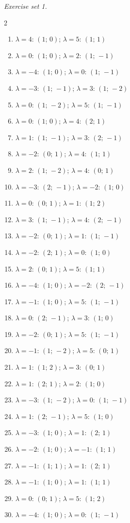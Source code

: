 \par\noindent\emph{Exercise set 1.}\nopagebreak
\begin{multicols}{2}\raggedright
\begin{enumerate}[label=\arabic*., leftmargin=*, itemsep=1pt]
\item $\lambda=4$: $(1;\,0)$; $\lambda=5$: $(1;\,1)$
\item $\lambda=0$: $(1;\,0)$; $\lambda=2$: $(1;\,-1)$
\item $\lambda=-4$: $(1;\,0)$; $\lambda=0$: $(1;\,-1)$
\item $\lambda=-3$: $(1;\,-1)$; $\lambda=3$: $(1;\,-2)$
\item $\lambda=0$: $(1;\,-2)$; $\lambda=5$: $(1;\,-1)$
\item $\lambda=0$: $(1;\,0)$; $\lambda=4$: $(2;\,1)$
\item $\lambda=1$: $(1;\,-1)$; $\lambda=3$: $(2;\,-1)$
\item $\lambda=-2$: $(0;\,1)$; $\lambda=4$: $(1;\,1)$
\item $\lambda=2$: $(1;\,-2)$; $\lambda=4$: $(0;\,1)$
\item $\lambda=-3$: $(2;\,-1)$; $\lambda=-2$: $(1;\,0)$
\item $\lambda=0$: $(0;\,1)$; $\lambda=1$: $(1;\,2)$
\item $\lambda=3$: $(1;\,-1)$; $\lambda=4$: $(2;\,-1)$
\item $\lambda=-2$: $(0;\,1)$; $\lambda=1$: $(1;\,-1)$
\item $\lambda=-2$: $(2;\,1)$; $\lambda=0$: $(1;\,0)$
\item $\lambda=2$: $(0;\,1)$; $\lambda=5$: $(1;\,1)$
\item $\lambda=-4$: $(1;\,0)$; $\lambda=-2$: $(2;\,-1)$
\item $\lambda=-1$: $(1;\,0)$; $\lambda=5$: $(1;\,-1)$
\item $\lambda=0$: $(2;\,-1)$; $\lambda=3$: $(1;\,0)$
\item $\lambda=-2$: $(0;\,1)$; $\lambda=5$: $(1;\,-1)$
\item $\lambda=-1$: $(1;\,-2)$; $\lambda=5$: $(0;\,1)$
\item $\lambda=1$: $(1;\,2)$; $\lambda=3$: $(0;\,1)$
\item $\lambda=1$: $(2;\,1)$; $\lambda=2$: $(1;\,0)$
\item $\lambda=-3$: $(1;\,-2)$; $\lambda=0$: $(1;\,-1)$
\item $\lambda=1$: $(2;\,-1)$; $\lambda=5$: $(1;\,0)$
\item $\lambda=-3$: $(1;\,0)$; $\lambda=1$: $(2;\,1)$
\item $\lambda=-2$: $(1;\,0)$; $\lambda=-1$: $(1;\,1)$
\item $\lambda=-1$: $(1;\,1)$; $\lambda=1$: $(2;\,1)$
\item $\lambda=-1$: $(1;\,0)$; $\lambda=1$: $(1;\,1)$
\item $\lambda=0$: $(0;\,1)$; $\lambda=5$: $(1;\,2)$
\item $\lambda=-4$: $(1;\,0)$; $\lambda=0$: $(1;\,-1)$
\end{enumerate}
\end{multicols}
